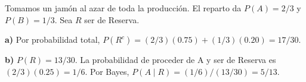 Tomamos un jamón al azar de toda la producción. El reparto
da $P(A)=2/3$ y $P(B)=1/3$. Sea $R$ ser de Reserva.

\textbf{a)} Por probabilidad total,
$P(R^c)=(2/3)(0.75)+(1/3)(0.20)=\boxed{17/30}$.

\textbf{b)} $P(R)=13/30$. La probabilidad de proceder de A
y ser de Reserva es $(2/3)(0.25)=1/6$. Por Bayes,
$P(A\mid R)=(1/6)/(13/30)=\boxed{5/13}$.
